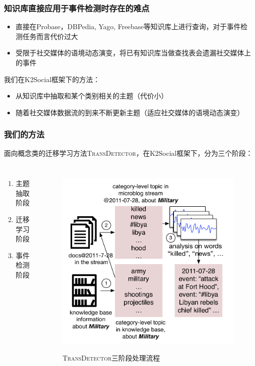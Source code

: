 \begin{frame}
\frametitle{\noindent 知识库直接应用于事件检测时存在的难点}	
\begin{itemize}
	\item 直接在Probase，DBPedia, Yago, Freebase等知识库上进行查询，对于事件检测任务而言代价过大
	\item 受限于社交媒体的语境动态演变，将已有知识库当做查找表会遗漏社交媒体上的事件
\end{itemize}


{\color{blue} 我们在K2Social框架下的方法：}
\begin{itemize}
	\item 从知识库中抽取和某个类别相关的主题（代价小）
	\item 随着社交媒体数据流的到来不断更新主题（适应社交媒体的语境动态演变）
\end{itemize}

\end{frame}



\begin{frame}
\frametitle{\noindent 我们的方法}
面向概念类的迁移学习方法\textsc{TransDetector}，在K2Social框架下，分为三个阶段：
\vspace{-6mm}
\begin{columns}[t]
\begin{enumerate}
	\item 主题抽取阶段 \\
	\item 迁移学习阶段 \\
	\item 事件检测阶段
\end{enumerate}

\begin{figure}[h]
		\setlength{\abovecaptionskip}{-4mm}
        \setlength{\belowcaptionskip}{0.cm}
        \centering
		\caption{\textsc{TransDetector}三阶段处理流程}
        \includegraphics[width=0.7\columnwidth]{img/NSDetectorExample.pdf}
        \label{fig:hood}
\end{figure}
\end{columns}

\end{frame}



